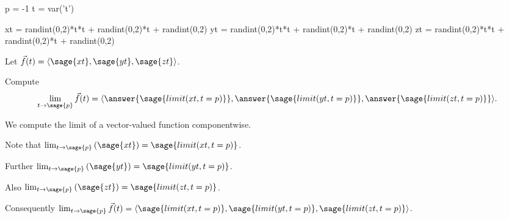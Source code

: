 \documentclass{ximera}
\author{Jim Fowler}
\begin{document}
\makerandom

\begin{sagesilent}
  p = -1
  t = var('t')
  
  xt = randint(0,2)*t*t + randint(0,2)*t + randint(0,2)
  yt = randint(0,2)*t*t + randint(0,2)*t + randint(0,2)
  zt = randint(0,2)*t*t + randint(0,2)*t + randint(0,2)
\end{sagesilent}

\begin{exercise}

  Let $\vec{f}(t) = \langle \sage{xt}, \sage{yt}, \sage{zt} \rangle$.

  Compute
  \[
    \lim_{t \to \sage{p}} \vec{f}(t) = \langle \answer{\sage{limit(xt,t=p)}}, \answer{\sage{limit(yt,t=p)}}, \answer{\sage{limit(zt,t=p)}} \rangle.
  \]
  
  \begin{hint}
    We compute the limit of a vector-valued function componentwise.
  \end{hint}

  \begin{hint}
    Note that $\lim_{t \to \sage{p}} \left( \sage{xt} \right) = \sage{limit(xt,t=p)}$.
  \end{hint}

  \begin{hint}
    Further $\lim_{t \to \sage{p}} \left( \sage{yt} \right) = \sage{limit(yt,t=p)}$.
  \end{hint}

  \begin{hint}
    Also $\lim_{t \to \sage{p}} \left( \sage{zt} \right) = \sage{limit(zt,t=p)}$.
  \end{hint}
  
  \begin{hint}
    Consequently $\lim_{t \to \sage{p}} \vec{f}(t) = \langle \sage{limit(xt,t=p)}, \sage{limit(yt,t=p)}, \sage{limit(zt,t=p)} \rangle$.
  \end{hint}          
  
\end{exercise}
\end{document}
